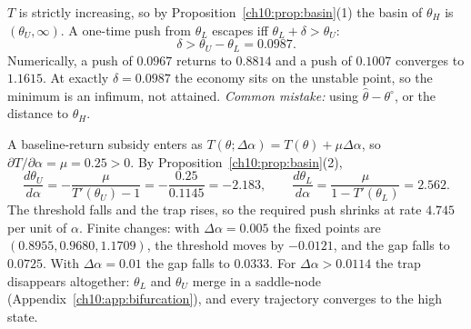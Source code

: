 \documentclass[../solutions_manual.tex]{subfiles}
\begin{document}
 $T$ is strictly increasing, so by Proposition~\ref{ch10:prop:basin}(1) the basin of $\theta_H$ is $(\theta_U, \infty)$. A one-time push from $\theta_L$ escapes iff $\theta_L + \delta > \theta_U$:
\[
\delta > \theta_U - \theta_L = 0.0987 .
\]
Numerically, a push of $0.0967$ returns to $0.8814$ and a push of $0.1007$ converges to $1.1615$. At exactly $\delta = 0.0987$ the economy sits on the unstable point, so the minimum is an infimum, not attained. \textit{Common mistake:} using $\hat\theta - \theta^{\circ}$, or the distance to $\theta_H$.

 A baseline-return subsidy enters as $T(\theta; \Delta\alpha) = T(\theta) + \mu\Delta\alpha$, so $\partial T/\partial\alpha = \mu = 0.25 > 0$. By Proposition~\ref{ch10:prop:basin}(2),
\[
\frac{d\theta_U}{d\alpha} = -\frac{\mu}{T'(\theta_U) - 1} = -\frac{0.25}{0.1145} = -2.183, \qquad
\frac{d\theta_L}{d\alpha} = \frac{\mu}{1 - T'(\theta_L)} = 2.562 .
\]
The threshold falls and the trap rises, so the required push shrinks at rate $4.745$ per unit of $\alpha$. Finite changes: with $\Delta\alpha = 0.005$ the fixed points are $(0.8955, 0.9680, 1.1709)$, the threshold moves by $-0.0121$, and the gap falls to $0.0725$. With $\Delta\alpha = 0.01$ the gap falls to $0.0333$. For $\Delta\alpha > 0.0114$ the trap disappears altogether: $\theta_L$ and $\theta_U$ merge in a saddle-node (Appendix~\ref{ch10:app:bifurcation}), and every trajectory converges to the high state.
\end{document}

